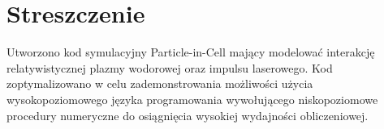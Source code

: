 \section{Streszczenie}
Utworzono kod symulacyjny Particle-in-Cell mający modelować interakcję relatywistycznej plazmy wodorowej oraz
impulsu laserowego. Kod zoptymalizowano w celu zademonstrowania możliwości użycia wysokopoziomowego języka programowania
wywołującego niskopoziomowe procedury numeryczne do osiągnięcia wysokiej wydajności obliczeniowej.
